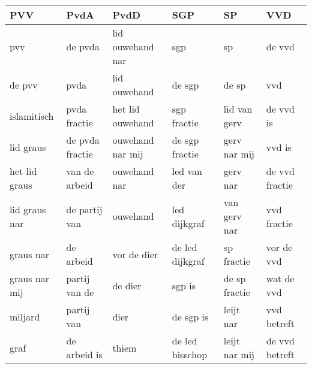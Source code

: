 \begin{tabular}{llllll}
\toprule
           PVV &             PvdA &              PvdD &              SGP &             SP &             VVD \\
\midrule
           pvv &          de pvda &  lid ouwehand nar &              sgp &             sp &          de vvd \\
        de pvv &             pvda &      lid ouwehand &           de sgp &          de sp &             vvd \\
   islamitisch &     pvda fractie &  het lid ouwehand &      sgp fractie &   lid van gerv &       de vvd is \\
     lid graus &  de pvda fractie &  ouwehand nar mij &   de sgp fractie &   gerv nar mij &          vvd is \\
 het lid graus &    van de arbeid &      ouwehand nar &      led van der &       gerv nar &  de vvd fractie \\
 lid graus nar &    de partij van &          ouwehand &     led dijkgraf &   van gerv nar &     vvd fractie \\
     graus nar &        de arbeid &       vor de dier &  de led dijkgraf &     sp fractie &      vor de vvd \\
 graus nar mij &    partij van de &           de dier &           sgp is &  de sp fractie &      wat de vvd \\
       miljard &       partij van &              dier &        de sgp is &      leijt nar &     vvd betreft \\
          graf &     de arbeid is &             thiem &  de led bisschop &  leijt nar mij &  de vvd betreft \\
\bottomrule
\end{tabular}
